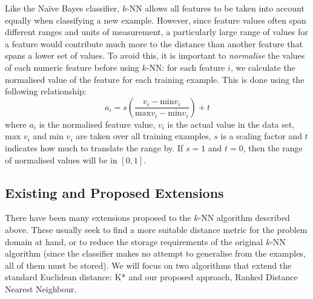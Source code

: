 \documentclass{article}
\begin{document}
Like the Na\"{i}ve Bayes classifier, $k$-NN allows all features to be taken
into account equally when classifying a new example. However, since feature
values often span different ranges and units of measurement, a particularly
large range of values for a feature would contribute much more to the distance
than another feature that spans a lower set of values.
To avoid this, it is important to \textit{normalise} the
values of each numeric feature before using $k$-NN: for each feature $i$, we
calculate the normalised value of the feature for each training example. This
is done using the following relationship:
\begin{equation*}
a_i = s\left(\dfrac{v_i - \mathrm{min }v_i}{\mathrm{max }v_i - \mathrm{min }v_i}\right) + t
\end{equation*}
where $a_i$ is the normalised feature value, $v_i$ is the actual value in the
data set, max $v_i$ and min $v_i$ are taken over all training examples, $s$ is
a scaling factor and $t$ indicates how much to translate the range by. If $s=1$
and $t=0$, then the range of normalised values will be in $[0,1]$.

\subsection{Existing and Proposed Extensions}
There have been many extensions proposed to the $k$-NN algorithm described
above. These usually seek to find a more suitable distance metric for the
problem domain at hand, or to reduce the storage requirements of the original
$k$-NN algorithm (since the classifier makes no attempt to generalise from the
examples, all of them must be stored).
We will focus on two algorithms that extend the standard Euclidean distance:
K* and our proposed approach, Ranked Distance Nearest Neighbour.
\end{document}
